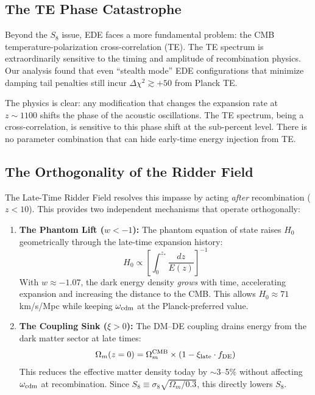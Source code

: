 \documentclass[twocolumn,showpacs,preprintnumbers,amsmath,amssymb,prd]{revtex4-2}
\begin{document}
\subsection{The TE Phase Catastrophe}

Beyond the $S_8$ issue, EDE faces a more fundamental problem: the CMB temperature-polarization cross-correlation (TE). The TE spectrum is extraordinarily sensitive to the timing and amplitude of recombination physics. Our analysis found that even ``stealth mode'' EDE configurations that minimize damping tail penalties still incur $\Delta\chi^2 \gtrsim +50$ from Planck TE.

The physics is clear: any modification that changes the expansion rate at $z \sim 1100$ shifts the phase of the acoustic oscillations. The TE spectrum, being a cross-correlation, is sensitive to this phase shift at the sub-percent level. There is no parameter combination that can hide early-time energy injection from TE.

\subsection{The Orthogonality of the Ridder Field}

The Late-Time Ridder Field resolves this impasse by acting \textit{after} recombination ($z < 10$). This provides two independent mechanisms that operate orthogonally:

\begin{enumerate}
    \item \textbf{The Phantom Lift ($w < -1$):} The phantom equation of state raises $H_0$ geometrically through the late-time expansion history:
    \begin{equation}
    H_0 \propto \left[\int_0^{z_*} \frac{dz}{E(z)}\right]^{-1}
    \end{equation}
    With $w \approx -1.07$, the dark energy density \textit{grows} with time, accelerating expansion and increasing the distance to the CMB. This allows $H_0 \approx 71$ km/s/Mpc while keeping $\omega_{\rm cdm}$ at the Planck-preferred value.
    
    \item \textbf{The Coupling Sink ($\xi > 0$):} The DM--DE coupling drains energy from the dark matter sector at late times:
    \begin{equation}
    \Omega_m(z=0) = \Omega_m^{\rm CMB} \times (1 - \xi_{\rm late} \cdot f_{\rm DE})
    \end{equation}
    This reduces the effective matter density today by $\sim$3--5\% without affecting $\omega_{\rm cdm}$ at recombination. Since $S_8 \equiv \sigma_8 \sqrt{\Omega_m/0.3}$, this directly lowers $S_8$.
\end{enumerate}
\end{document}
